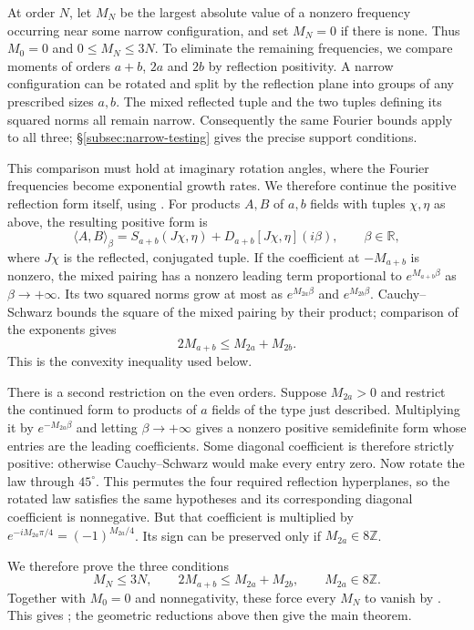 \documentclass[11pt, letterpaper, reqno]{amsart}
\theoremstyle{definition}
\theoremstyle{remark}
\newcommand{\bbR}{\mathbb{R}}
\newcommand{\bbZ}{\mathbb{Z}}
\begin{document}
At order $N$, let $M_N$ be the largest absolute value of a nonzero
frequency occurring near some narrow configuration, and set $M_N=0$
if there is none. Thus $M_0=0$ and $0\leq M_N\leq3N$.
To eliminate the remaining frequencies, we compare moments of orders
$a+b$, $2a$ and $2b$ by reflection positivity. A narrow configuration
can be rotated and split by the reflection plane into groups of any
prescribed sizes $a,b$. The mixed reflected tuple and the two tuples
defining its squared norms all remain narrow. Consequently the same
Fourier bounds apply to all three; \S\ref{subsec:narrow-testing}
gives the precise support conditions.

This comparison must hold at imaginary rotation angles, where the
Fourier frequencies become exponential growth rates. We therefore
continue the positive reflection form itself, using
. For products $A,B$ of $a,b$ fields
with tuples $\chi,\eta$ as above, the resulting positive form is
\[
 \langle A,B\rangle_\beta
 =S_{a+b}(J\chi,\eta)+D_{a+b}[J\chi,\eta](i\beta),
 \qquad\beta\in\bbR,
\]
where $J\chi$ is the reflected, conjugated tuple. If the coefficient
at $-M_{a+b}$ is nonzero, the mixed pairing has a nonzero leading
term proportional to $e^{M_{a+b}\beta}$ as $\beta\to+\infty$.
Its two squared norms grow at most as $e^{M_{2a}\beta}$ and
$e^{M_{2b}\beta}$. Cauchy--Schwarz bounds the square of the mixed
pairing by their product; comparison of the exponents gives
\begin{equation}\label{eq:convexity-preview}
 2M_{a+b}\leq M_{2a}+M_{2b}.
\end{equation}
This is the convexity inequality used below.

There is a second restriction on the even orders. Suppose $M_{2a}>0$
and restrict the continued form to products of $a$ fields of the type
just described. Multiplying it by $e^{-M_{2a}\beta}$ and letting
$\beta\to+\infty$ gives a nonzero positive semidefinite form whose
entries are the leading coefficients. Some diagonal coefficient is
therefore strictly positive: otherwise Cauchy--Schwarz would
make every entry zero. Now rotate the law through $45^\circ$. This
permutes the four required reflection hyperplanes, so the rotated
law satisfies the same hypotheses and its corresponding diagonal
coefficient is nonnegative. But that coefficient is multiplied by
$e^{-iM_{2a}\pi/4}=(-1)^{M_{2a}/4}$. Its sign can be preserved only
if $M_{2a}\in8\bbZ$.

We therefore prove the three conditions
\[
 M_N\leq3N,\qquad 2M_{a+b}\leq M_{2a}+M_{2b},\qquad
 M_{2a}\in8\bbZ.
\]
Together with $M_0=0$ and nonnegativity, these force every $M_N$ to
vanish by . This gives ; the
geometric reductions above then give the main theorem.
\end{document}
